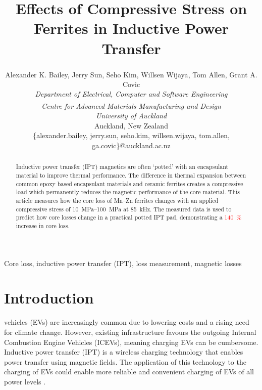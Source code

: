 \documentclass[conference]{IEEEtran}
\begin{document}
\title{Effects of Compressive Stress on Ferrites in Inductive Power Transfer}

\author{
  Alexander K. Bailey, Jerry Sun\textsuperscript{\textdagger}, Seho Kim, Willsen Wijaya\textsuperscript{\textdagger}, Tom Allen\textsuperscript{\textdagger}, Grant A. Covic\\
  \textit{Department of Electrical, Computer and Software Engineering}\\
  \textit{\textsuperscript{\textdagger}Centre for Advanced Materials Manufacturing and Design}\\
  \textit{University of Auckland}\\
  Auckland, New Zealand\\
  \{alexander.bailey, jerry.sun, seho.kim, willsen.wijaya, tom.allen, ga.covic\}@auckland.ac.nz\\ 
}
\maketitle

\begin{abstract}
  Inductive power transfer (IPT) magnetics are often `potted' with an encapsulant material to improve thermal performance.
  The difference in thermal expansion between common epoxy based encapsulant materials and ceramic ferrites creates a compressive load which permanently reduces the magnetic performance of the core material. 
  This article measures how the core loss of Mn--Zn ferrites changes with an applied compressive stress of \SIrange{10}{100}{\mega\pascal} at \SI{85}{\kilo\hertz}. 
  The measured data is used to predict how core losses change in a practical potted IPT pad, demonstrating a \textcolor{red}{\SI{140}{\percent}} increase in core loss. 
\end{abstract}

\begin{IEEEkeywords}
Core loss, inductive power transfer (IPT), loss measurement, magnetic losses
\end{IEEEkeywords}

\section{Introduction}

 vehicles (EVs) are increasingly common due to lowering costs and a rising need for climate change. 
However, existing infrastructure favours the outgoing Internal Combustion Engine Vehicles (ICEVs), meaning charging EVs can be cumbersome. 
Inductive power transfer (IPT) is a wireless charging technology that enables power transfer using magnetic fields. 
The application of this technology to the charging of EVs could enable more reliable and convenient charging of EVs of all power levels \cite{covicModernTrendsInductive2013b}. 
\end{document}
